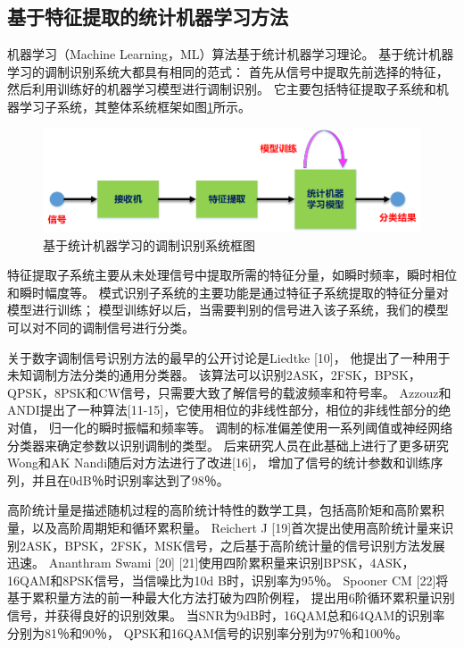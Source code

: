 \subsection{基于特征提取的统计机器学习方法}

机器学习（Machine Learning，ML）算法基于统计机器学习理论。
基于统计机器学习的调制识别系统大都具有相同的范式：
首先从信号中提取先前选择的特征，然后利用训练好的机器学习模型进行调制识别。
它主要包括特征提取子系统和机器学习子系统，其整体系统框架如图\ref{sec:fig_1_1}所示。\par

\begin{figure}
	\centering
	\includegraphics[scale=0.6]{figures/chapter_1/fig_1_1}
	\caption{基于统计机器学习的调制识别系统框图} \label{sec:fig_1_1}
\end{figure}

特征提取子系统主要从未处理信号中提取所需的特征分量，如瞬时频率，瞬时相位和瞬时幅度等。 
模式识别子系统的主要功能是通过特征子系统提取的特征分量对模型进行训练；
模型训练好以后，当需要判别的信号进入该子系统，我们的模型可以对不同的调制信号进行分类。\par

关于数字调制信号识别方法的最早的公开讨论是Liedtke [10]， 他提出了一种用于未知调制方法分类的通用分类器。 
该算法可以识别2ASK，2FSK，BPSK，QPSK，8PSK和CW信号，只需要大致了解信号的载波频率和符号率。 Azzouz和ANDI提出了一种算法[11-15]，它使用相位的非线性部分，相位的非线性部分的绝对值，
归一化的瞬时振幅和频率等。
调制的标准偏差使用一系列阈值或神经网络分类器来确定参数以识别调制的类型。
 后来研究人员在此基础上进行了更多研究 Wong和AK Nandi随后对方法进行了改进[16]，
增加了信号的统计参数和训练序列，并且在0dB％时识别率达到了98％。\par

高阶统计量是描述随机过程的高阶统计特性的数学工具，包括高阶矩和高阶累积量，以及高阶周期矩和循环累积量。
Reichert J [19]首次提出使用高阶统计量来识别2ASK，BPSK，2FSK，MSK信号，之后基于高阶统计量的信号识别方法发展迅速。
Ananthram Swami [20] [21]使用四阶累积量来识别BPSK，4ASK，16QAM和8PSK信号，当信噪比为10d B时，识别率为95％。 
Spooner CM [22]将基于累积量方法的前一种最大化方法打破为四阶例程，
提出用6阶循环累积量识别信号，并获得良好的识别效果。
当SNR为9dB时，16QAM总和64QAM的识别率分别为81％和90％，
QPSK和16QAM信号的识别率分别为97％和100％。\par

